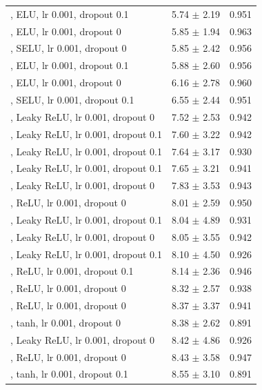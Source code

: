 \documentclass[journal,article,submit,pdftex,moreauthors]{Definitions/mdpi}
\begin{document}
\begin{center}
\begin{longtable}{@{}p{8.2cm} c c@{}}
\quad [64, 32, 16, 8], ELU, lr 0.001, dropout 0.1 & 5.74 $\pm$ 2.19 & 0.951 \\
\quad [64, 32, 16, 8], ELU, lr 0.001, dropout 0 & 5.85 $\pm$ 1.94 & 0.963 \\
\quad [128, 64, 32, 16, 8], SELU, lr 0.001, dropout 0 & 5.85 $\pm$ 2.42 & 0.956 \\
\quad [128, 64, 32, 16, 8], ELU, lr 0.001, dropout 0.1 & 5.88 $\pm$ 2.60 & 0.956 \\
\quad [128, 64, 32, 16, 8], ELU, lr 0.001, dropout 0 & 6.16 $\pm$ 2.78 & 0.960 \\
\quad [128, 64, 32, 16, 8], SELU, lr 0.001, dropout 0.1 & 6.55 $\pm$ 2.44 & 0.951 \\
\quad [32, 16, 8], Leaky ReLU, lr 0.001, dropout 0 & 7.52 $\pm$ 2.53 & 0.942 \\
\quad [64, 32, 16], Leaky ReLU, lr 0.001, dropout 0.1 & 7.60 $\pm$ 3.22 & 0.942 \\
\quad [32, 16, 8], Leaky ReLU, lr 0.001, dropout 0.1 & 7.64 $\pm$ 3.17 & 0.930 \\
\quad [128, 64, 32], Leaky ReLU, lr 0.001, dropout 0.1 & 7.65 $\pm$ 3.21 & 0.941 \\
\quad [128, 64, 32, 16, 8], Leaky ReLU, lr 0.001, dropout 0 & 7.83 $\pm$ 3.53 & 0.943 \\
\quad [128, 64, 32], ReLU, lr 0.001, dropout 0 & 8.01 $\pm$ 2.59 & 0.950 \\
\quad [128, 64, 32, 16, 8], Leaky ReLU, lr 0.001, dropout 0.1 & 8.04 $\pm$ 4.89 & 0.931 \\
\quad [128, 64, 32], Leaky ReLU, lr 0.001, dropout 0 & 8.05 $\pm$ 3.55 & 0.942 \\
\quad [64, 32, 16, 8], Leaky ReLU, lr 0.001, dropout 0.1 & 8.10 $\pm$ 4.50 & 0.926 \\
\quad [128, 64, 32], ReLU, lr 0.001, dropout 0.1 & 8.14 $\pm$ 2.36 & 0.946 \\
\quad [32, 16, 8], ReLU, lr 0.001, dropout 0 & 8.32 $\pm$ 2.57 & 0.938 \\
\quad [128, 64, 32, 16, 8], ReLU, lr 0.001, dropout 0 & 8.37 $\pm$ 3.37 & 0.941 \\
\quad [64, 32, 16], tanh, lr 0.001, dropout 0 & 8.38 $\pm$ 2.62 & 0.891 \\
\quad [64, 32, 16, 8], Leaky ReLU, lr 0.001, dropout 0 & 8.42 $\pm$ 4.86 & 0.926 \\
\quad [64, 32, 16, 8], ReLU, lr 0.001, dropout 0 & 8.43 $\pm$ 3.58 & 0.947 \\
\quad [64, 32, 16], tanh, lr 0.001, dropout 0.1 & 8.55 $\pm$ 3.10 & 0.891 \\

\end{longtable}
\end{center}
\end{document}
